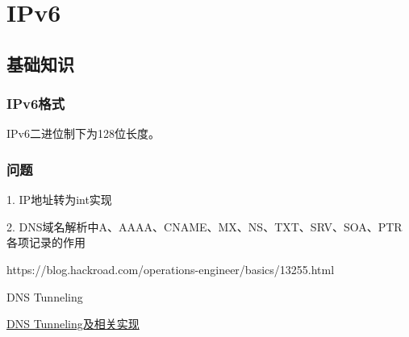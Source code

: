 \chapter{IPv6}

\section{基础知识}
\label{chap:ipv6_base}

\subsection{IPv6格式}

IPv6二进位制下为128位长度。




\subsection{问题}

 1. IP地址转为int实现


2. DNS域名解析中A、AAAA、CNAME、MX、NS、TXT、SRV、SOA、PTR各项记录的作用

https://blog.hackroad.com/operations-engineer/basics/13255.html


DNS Tunneling


\href{https://www.freebuf.com/sectool/112076.html}{DNS Tunneling及相关实现}

